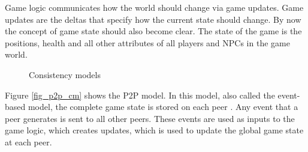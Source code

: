 \documentclass[journal,oneside,a4paper,onecolumn]{IEEEtran}
\begin{document}
Game logic communicates how the world should change via game updates. Game updates are the deltas that specify how the current state should change. By now the concept of game state should also become clear. The state of the game is the positions, health and all other attributes of all players and NPCs in the game world.

\begin{figure}[htbp]
\centering
{}
\caption{Consistency models}
\end{figure}
%
Figure \ref{fig_p2p_cm} shows the P2P model. In this model, also called the event-based model, the complete game state is stored on each peer \cite{}. Any event that a peer generates is sent to all other peers. These events are used as inputs to the game logic, which creates updates, which is used to update the global game state at each peer.
\end{document}

